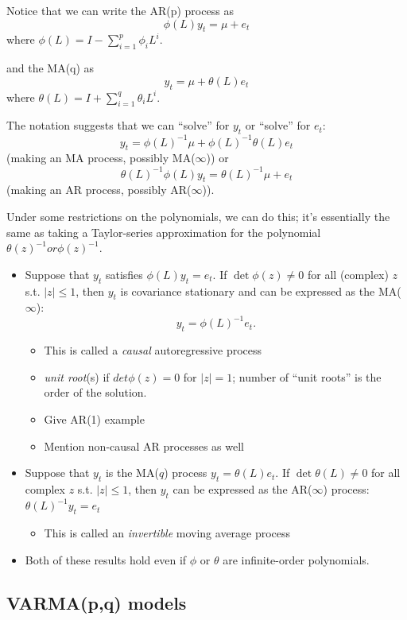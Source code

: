 Notice that we can write the AR(p) process as
\[\phi(L) y_{t} = \mu + e_t \]
where $\phi(L) = I - \sum_{i=1}^p \phi_i L^i$.

and the MA(q) as
\[y_t = \mu + \theta(L) e_t\]
where $\theta(L) = I + \sum_{i=1}^q \theta_i L^i$.

The notation suggests that we can ``solve'' for $y_t$ or ``solve'' for
$e_t$:
\[y_t = \phi(L)^{-1} \mu + \phi(L)^{-1} \theta(L) e_t\]
(making an MA process, possibly MA($\infty$)) or
\[\theta(L)^{-1} \phi(L) y_t = \theta(L)^{-1} \mu + e_t\]
(making an AR process, possibly AR($\infty$)).

Under some restrictions on the polynomials, we can do this; it's
essentially the same as taking a Taylor-series approximation for the
polynomial $\theta(z)^{-1} or \phi(z)^{-1}$.

\begin{itemize}
\item Suppose that $y_t$ satisfies $\phi(L) y_t = e_t$. If $\det \phi(z) \neq 0$
  for all (complex) $z$ s.t. $|z| \leq 1$, then $y_t$ is covariance
  stationary and can be expressed as the MA($\infty$):
  \[y_t = \phi(L)^{-1} e_t.\]
  \begin{itemize}
  \item This is called a \emph{causal} autoregressive process
  \item \emph{unit root}(s) if $det \phi(z) = 0$ for $|z| = 1$; number of
    ``unit roots'' is the order of the solution.
  \item Give AR(1) example
  \item Mention non-causal AR processes as well
  \end{itemize}
\item Suppose that $y_t$ is the MA($q$) process $y_t = \theta(L) e_t$. If
  $\det \theta(L) \neq 0$ for all complex $z$ s.t. $|z| \leq 1$, then $y_t$ can be
  expressed as the AR($\infty$) process: $\theta(L)^{-1} y_t = e_t$

  \begin{itemize}
  \item This is called an \emph{invertible} moving average process
  \end{itemize}
\item Both of these results hold even if $\phi$ or $\theta$ are infinite-order
  polynomials.
\end{itemize}

\subsection{VARMA(p,q) models}

